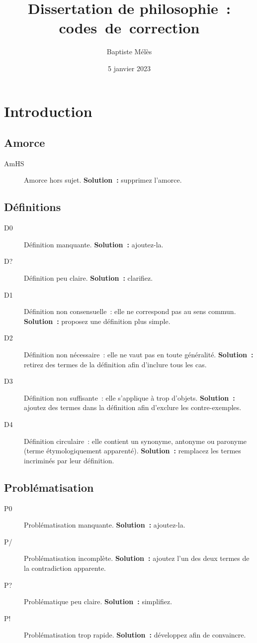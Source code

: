 \documentclass[a4paper,11pt]{article}
\author{Baptiste Mélès}
\date{5 janvier 2023}
\title{Dissertation de philosophie : codes de correction}
\begin{document}
\maketitle

\section{Introduction}
\label{sec:org0fdeb67}

\subsection{Amorce}
\label{sec:orge6df1db}
\begin{description}
\item[{AmHS}] Amorce hors sujet. \textbf{Solution :} supprimez l'amorce.
\end{description}

\subsection{Définitions}
\label{sec:orgc2e7996}
\begin{description}
\item[{D0}] Définition manquante. \textbf{Solution :} ajoutez-la.
\item[{D\string?}] Définition peu claire. \textbf{Solution :} clarifiez.
\item[{D1}] Définition non consensuelle : elle ne correspond pas au sens
commun. \textbf{Solution :} proposez une définition plus simple.
\item[{D2}] Définition non nécessaire : elle ne vaut pas en toute
généralité. \textbf{Solution :} retirez des termes de la définition afin
d'inclure tous les cas.
\item[{D3}] Définition non suffisante : elle s'applique à trop d'objets.
\textbf{Solution :} ajoutez des termes dans la définition afin d'exclure les
contre-exemples.
\item[{D4}] Définition circulaire : elle contient un synonyme, antonyme ou
paronyme (terme étymologiquement apparenté). \textbf{Solution :} remplacez
les termes incriminés par leur définition.
\end{description}

\subsection{Problématisation}
\label{sec:org6c6d1bb}
\begin{description}
\item[{P0}] Problématisation manquante. \textbf{Solution :} ajoutez-la.
\item[{P/}] Problématisation incomplète. \textbf{Solution :} ajoutez l'un des deux
termes de la contradiction apparente.
\item[{P\string?}] Problématique peu claire. \textbf{Solution :} simplifiez.
\item[{P\string!}] Problématisation trop rapide. \textbf{Solution :} développez afin de
convaincre.
\end{description}
\end{document}
